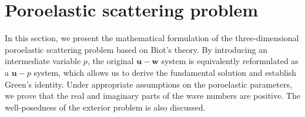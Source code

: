 \documentclass[11pt]{article}
\begin{document}
\section{Poroelastic scattering problem}\label{sec:scattering model}
\setcounter{equation}{0}

In this section, we present the mathematical formulation of the three-dimensional poroelastic 
scattering problem based on Biot's theory. By introducing an intermediate variable $p$, the 
original $\mathbf{u}-\mathbf{w}$ system is equivalently reformulated as a $\mathbf{u}-p$ system, 
which allows us to derive the fundamental solution and establish Green's identity. Under appropriate 
assumptions on the poroelastic parameters, we prove that the real and imaginary parts of the wave 
numbers are positive. The well-posedness of the exterior problem is also discussed.
\end{document}
